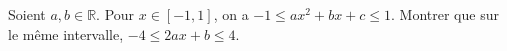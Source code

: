 Soient $a, b \in \mathbb{R}$. Pour $x \in [-1, 1]$, on a $-1 \leq ax^2 + bx + c \leq 1$. Montrer que sur le même intervalle, $-4 \leq 2ax + b \leq 4$.

